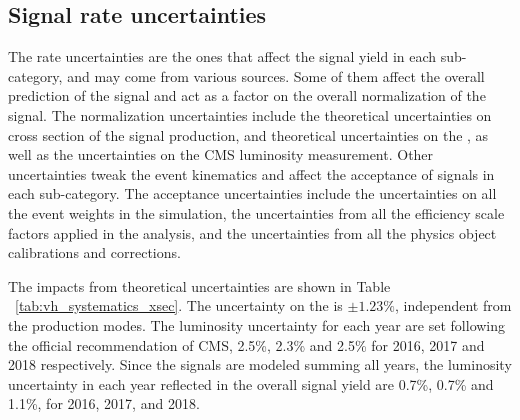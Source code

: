 \subsection{Signal rate uncertainties}\label{sec:rate_uncertainty}

The rate uncertainties are the ones that affect the signal yield in each sub-category, and may come from various sources.
Some of them affect the overall prediction of the signal and act as a factor on the overall normalization of the signal.
The normalization uncertainties include the theoretical uncertainties on cross section of the signal production, 
and theoretical uncertainties on the \brhmm, as well as the uncertainties on the CMS luminosity measurement.
Other uncertainties tweak the event kinematics and affect the acceptance of signals in each sub-category.
The acceptance uncertainties include the uncertainties on all the event weights in the simulation, 
the uncertainties from all the efficiency scale factors applied in the analysis, 
and the uncertainties from all the physics object calibrations and corrections.

The impacts from theoretical uncertainties are shown in Table ~\ref{tab:vh_systematics_xsec}. 
The uncertainty on the \brhmm is $\pm 1.23\%$, independent from the production modes.
The luminosity uncertainty for each year are set following the official recommendation of CMS, 
2.5\%, 2.3\% and 2.5\% for 2016, 2017 and 2018 respectively. 
Since the signals are modeled summing all years, 
the luminosity uncertainty in each year reflected in the overall signal yield are 0.7\%, 0.7\% and 1.1\%, for 2016, 2017, and 2018. 


